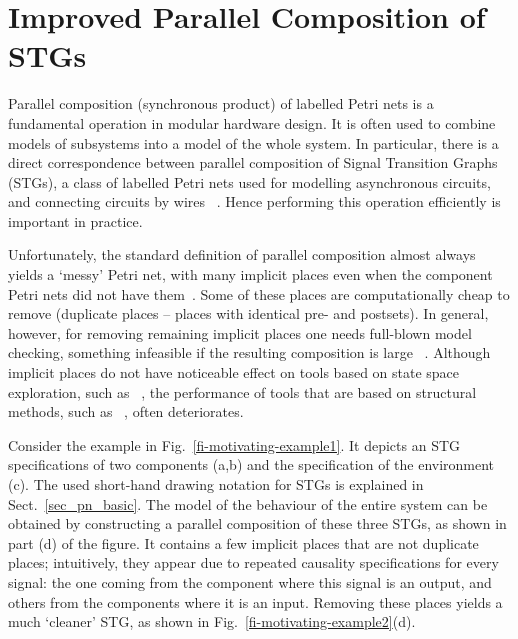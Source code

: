 \section{Improved Parallel Composition of STGs}\label{sec_intro}


Parallel composition (synchronous product) of labelled
Petri nets is a fundamental operation in modular hardware design. It is
often used to combine models of subsystems into a model of the
whole system. In particular, there is a direct correspondence
between parallel composition of Signal Transition Graphs
(STGs), a class of labelled Petri nets used for modelling
asynchronous circuits, and connecting circuits by wires ~\cite{PN_direct_correspondence}. Hence
performing this operation efficiently is important in practice.

Unfortunately, the standard definition of parallel composition almost always yields a `messy' Petri net, with many implicit places even when the component Petri nets did not have them~\cite{STG_parallel_composition}. Some of these places are computationally cheap to remove (\eg duplicate places -- places with identical pre- and postsets). In general, however, for removing remaining implicit places one needs full-blown model checking, something infeasible if the resulting composition is large ~\cite{PN_place_removal}.
Although implicit places do not have noticeable effect on tools based on state space exploration, such as \petrify~\cite{ckkly97}, the performance of tools that are based on structural methods, such as \desij~\cite{Sch07}, often deteriorates.

Consider the example in Fig.~\ref{fi-motivating-example1}. It
depicts an STG specifications of two components (a,b) and
the specification of the environment (c). The used short-hand
drawing notation for STGs is explained in
Sect.~\ref{sec_pn_basic}. The model of the behaviour of the
entire system can be obtained by constructing a parallel
composition of these three STGs, as shown in part (d) of
the figure. It contains a few implicit places
that are not duplicate places; intuitively, they appear due
to repeated causality specifications for every signal: the one
coming from the component where this signal is an output, and
others from the components where it is an input. Removing
these places yields a much `cleaner' STG, as
shown in Fig.~\ref{fi-motivating-example2}(d).

